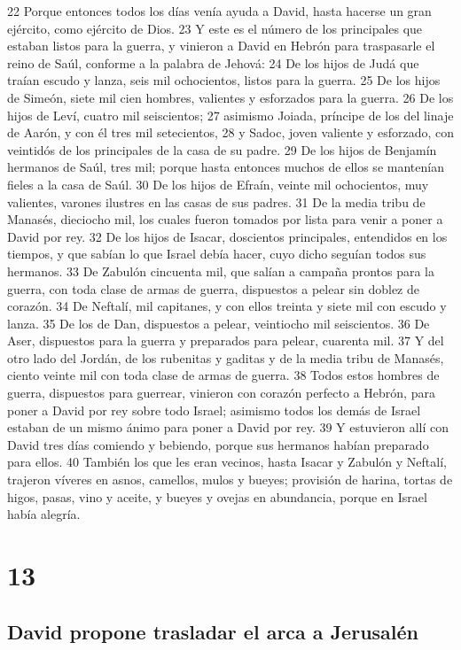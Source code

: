 22 Porque entonces todos los días venía ayuda a David, hasta hacerse un gran ejército, como ejército de Dios.
23 Y este es el número de los principales que estaban listos para la guerra, y vinieron a David en Hebrón para traspasarle el reino de Saúl, conforme a la palabra de Jehová:
24 De los hijos de Judá que traían escudo y lanza, seis mil ochocientos, listos para la guerra.
25 De los hijos de Simeón, siete mil cien hombres, valientes y esforzados para la guerra.
26 De los hijos de Leví, cuatro mil seiscientos;
27 asimismo Joiada, príncipe de los del linaje de Aarón, y con él tres mil setecientos,
28 y Sadoc, joven valiente y esforzado, con veintidós de los principales de la casa de su padre.
29 De los hijos de Benjamín hermanos de Saúl, tres mil; porque hasta entonces muchos de ellos se mantenían fieles a la casa de Saúl.
30 De los hijos de Efraín, veinte mil ochocientos, muy valientes, varones ilustres en las casas de sus padres.
31 De la media tribu de Manasés, dieciocho mil, los cuales fueron tomados por lista para venir a poner a David por rey.
32 De los hijos de Isacar, doscientos principales, entendidos en los tiempos, y que sabían lo que Israel debía hacer, cuyo dicho seguían todos sus hermanos.
33 De Zabulón cincuenta mil, que salían a campaña prontos para la guerra, con toda clase de armas de guerra, dispuestos a pelear sin doblez de corazón.
34 De Neftalí, mil capitanes, y con ellos treinta y siete mil con escudo y lanza.
35 De los de Dan, dispuestos a pelear, veintiocho mil seiscientos.
36 De Aser, dispuestos para la guerra y preparados para pelear, cuarenta mil.
37 Y del otro lado del Jordán, de los rubenitas y gaditas y de la media tribu de Manasés, ciento veinte mil con toda clase de armas de guerra.
38 Todos estos hombres de guerra, dispuestos para guerrear, vinieron con corazón perfecto a Hebrón, para poner a David por rey sobre todo Israel; asimismo todos los demás de Israel estaban de un mismo ánimo para poner a David por rey.
39 Y estuvieron allí con David tres días comiendo y bebiendo, porque sus hermanos habían preparado para ellos.
40 También los que les eran vecinos, hasta Isacar y Zabulón y Neftalí, trajeron víveres en asnos, camellos, mulos y bueyes; provisión de harina, tortas de higos, pasas, vino y aceite, y bueyes y ovejas en abundancia, porque en Israel había alegría.


\chapter{13}

\section*{David propone trasladar el arca a Jerusalén}

